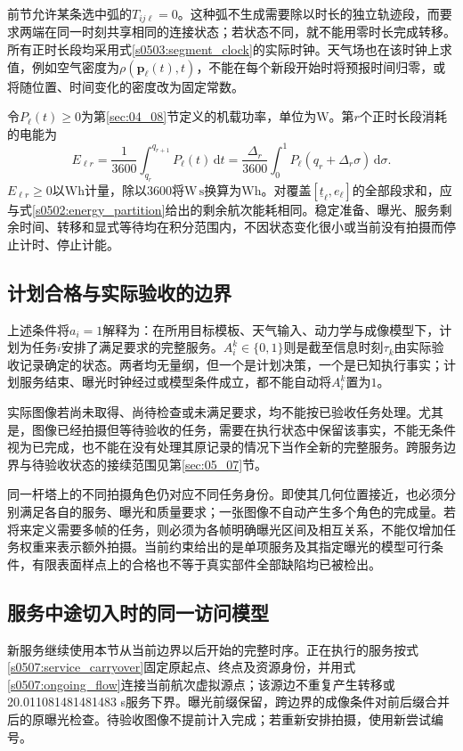 前节允许某条选中弧的$T_{ij\ell}=0$。这种弧不生成需要除以时长的独立轨迹段，而要求两端在同一时刻共享相同的连接状态；若状态不同，就不能用零时长完成转移。所有正时长段均采用式\eqref{s0503:segment_clock}的实际时钟。天气场也在该时钟上求值，例如空气密度为$\rho(\mathbf p_\ell(t),t)$，不能在每个新段开始时将预报时间归零，或将随位置、时间变化的密度改为固定常数。

令$P_\ell(t)\ge0$为第\ref{sec:04_08}节定义的机载功率，单位为$\mathrm W$。第$r$个正时长段消耗的电能为
\begin{equation}
 E_{\ell r}
 =\frac{1}{3600}\int_{q_r}^{q_{r+1}}P_\ell(t)\,\mathrm dt
 =\frac{\Delta_r}{3600}\int_0^1
 P_\ell(q_r+\Delta_r\sigma)\,\mathrm d\sigma.
 \label{s0503:segment_energy}
\end{equation}
$E_{\ell r}\ge0$以$\mathrm{Wh}$计量，除以$3600$将$\mathrm{W\,s}$换算为$\mathrm{Wh}$。对覆盖$[\underline t_\ell,e_\ell]$的全部段求和，应与式\eqref{s0502:energy_partition}给出的剩余航次能耗相同。稳定准备、曝光、服务剩余时间、转移和显式等待均在积分范围内，不因状态变化很小或当前没有拍摄而停止计时、停止计能。

\subsection{计划合格与实际验收的边界}

上述条件将$a_i=1$解释为：在所用目标模板、天气输入、动力学与成像模型下，计划为任务$i$安排了满足要求的完整服务。$A_i^k\in\{0,1\}$则是截至信息时刻$\tau_k$由实际验收记录确定的状态。两者均无量纲，但一个是计划决策，一个是已知执行事实；计划服务结束、曝光时钟经过或模型条件成立，都不能自动将$A_i^k$置为$1$。

实际图像若尚未取得、尚待检查或未满足要求，均不能按已验收任务处理。尤其是，图像已经拍摄但等待验收的任务，需要在执行状态中保留该事实，不能无条件视为已完成，也不能在没有处理其原记录的情况下当作全新的完整服务。跨服务边界与待验收状态的接续范围见第\ref{sec:05_07}节。

同一杆塔上的不同拍摄角色仍对应不同任务身份。即使其几何位置接近，也必须分别满足各自的服务、曝光和质量要求；一张图像不自动产生多个角色的完成量。若将来定义需要多帧的任务，则必须为各帧明确曝光区间及相互关系，不能仅增加任务权重来表示额外拍摄。当前约束给出的是单项服务及其指定曝光的模型可行条件，有限表面样点上的合格也不等于真实部件全部缺陷均已被检出。

\subsection{服务中途切入时的同一访问模型}
新服务继续使用本节从当前边界以后开始的完整时序。正在执行的服务按式\eqref{s0507:service_carryover}固定原起点、终点及资源身份，并用式\eqref{s0507:ongoing_flow}连接当前航次虚拟源点；该源边不重复产生转移或20.011081481481483 s服务下界。曝光前缀保留，跨边界的成像条件对前后缀合并后的原曝光检查。待验收图像不提前计入完成；若重新安排拍摄，使用新尝试编号。
